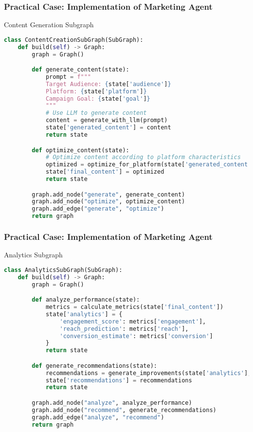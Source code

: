 \begin{frame}[fragile]\frametitle{Practical Case: Implementation of Marketing Agent}

Content Generation Subgraph

\begin{lstlisting}[language=Python, basicstyle=\tiny]
class ContentCreationSubGraph(SubGraph):
    def build(self) -> Graph:
        graph = Graph()

        def generate_content(state):
            prompt = f"""
            Target Audience: {state['audience']}
            Platform: {state['platform']}
            Campaign Goal: {state['goal']}
            """
            # Use LLM to generate content
            content = generate_with_llm(prompt)
            state['generated_content'] = content
            return state

        def optimize_content(state):
            # Optimize content according to platform characteristics
            optimized = optimize_for_platform(state['generated_content'], state['platform'])
            state['final_content'] = optimized
            return state

        graph.add_node("generate", generate_content)
        graph.add_node("optimize", optimize_content)
        graph.add_edge("generate", "optimize")
        return graph
\end{lstlisting}
\end{frame}

\begin{frame}[fragile]\frametitle{Practical Case: Implementation of Marketing Agent}

Analytics Subgraph

\begin{lstlisting}[language=Python, basicstyle=\tiny]
class AnalyticsSubGraph(SubGraph):
    def build(self) -> Graph:
        graph = Graph()

        def analyze_performance(state):
            metrics = calculate_metrics(state['final_content'])
            state['analytics'] = {
                'engagement_score': metrics['engagement'],
                'reach_prediction': metrics['reach'],
                'conversion_estimate': metrics['conversion']
            }
            return state

        def generate_recommendations(state):
            recommendations = generate_improvements(state['analytics'], state['goal'])
            state['recommendations'] = recommendations
            return state

        graph.add_node("analyze", analyze_performance)
        graph.add_node("recommend", generate_recommendations)
        graph.add_edge("analyze", "recommend")
        return graph
\end{lstlisting}
\end{frame}

